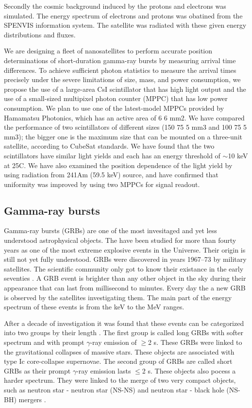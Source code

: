 \documentclass[12pt, a4paper,titlepage]{article}
\numberwithin{equation}{section}
\numberwithin{figure}{section}
\begin{document}
Secondly the cosmic background induced by the protons and electrons was simulated. The energy spectrum of electrons and protons was obatined from the SPENVIS information system. The satellite was radiated with these given energy distributions and fluxes.
 
We are designing a fleet of nanosatellites to perform accurate position determinations
of short-duration gamma-ray bursts by measuring arrival time differences.
To achieve sufficient photon statistics to measure the arrival times
precisely under the severe limitations of size, mass, and power consumption,
we propose the use of a large-area CsI scintillator that has high light output
and the use of a small-sized multipixel photon counter (MPPC) that has low
power consumption. We plan to use one of the latest-model MPPCs provided
by Hamamatsu Photonics, which has an active area of 6  6 mm2. We have compared the performance of two scintillators of different sizes (150 75  5 mm3 and 100  75  5 mm3); the bigger one is the maximum size that can be mounted on a three-unit satellite, according to CubeSat standards.
We have found that the two scintillators have similar light yields and each has an energy threshold of $\sim$10 keV at 25C. We have also examined the position dependence of the light yield by using radiation from 241Am (59.5 keV) source, and have confirmed that uniformity was improved by using two MPPCs for signal readout. 
 
\pagebreak

\subsection{Gamma-ray bursts}

Gamma-ray bursts (GRBs) \cite{grb1,grb2,grb3,grb4} are one of the most invesitaged and yet less understood astrophysical objects. The have been studied for more than fourty years as one of the most extreme explosive events in the Universe. Their origin is still not yet fully understood. GRBs were discovered in years 1967–73 by military satellites. The scientific community only got to know their existance in the early seventies \cite{grb5}. A GRB event is brighter than any other object in the sky during their appearance that can last from millisecond to minutes. Every day the a new GRB is observed by the satellites investigating them. The main part of the energy spectrum of these events is from the keV to the MeV ranges.

After a decade of investigation it was found that these events can be categorized into two groups by their length \cite{grb6,grb7,grb8}. The first group is called long GRBs with softer spectrum and with prompt $\gamma$-ray emission of $\geqslant$2 s. These GRBs were linked to the gravitational collapses of massive stars. These objects are associated  with type Ic core-collapse supernovae. The second group of GRBs are called short GRBs as their prompt $\gamma$-ray emission lasts $\leqslant$2 s. These objects also pocess a harder spectrum. They were linked to the merge of two very compact objects, such as neutron star - neutron star (NS-NS) and neutron star - black hole (NS-BH) mergers \cite{grb9}.
\end{document}
